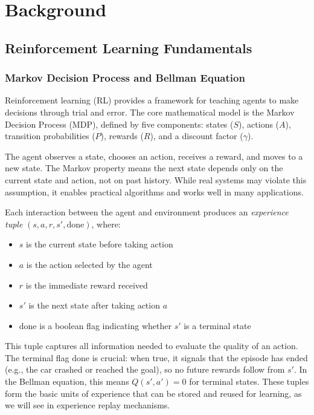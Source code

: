 \chapter{Background}
\section{Reinforcement Learning Fundamentals}

\subsection{Markov Decision Process and Bellman Equation}

Reinforcement learning (RL) provides a framework for teaching agents to make decisions through trial and error. The core mathematical model is the Markov Decision Process (MDP), defined by five components: states ($S$), actions ($A$), transition probabilities ($P$), rewards ($R$), and a discount factor ($\gamma$).

The agent observes a state, chooses an action, receives a reward, and moves to a new state. The Markov property means the next state depends only on the current state and action, not on past history. While real systems may violate this assumption, it enables practical algorithms and works well in many applications.\textbf{}

Each interaction between the agent and environment produces an \textit{experience tuple} $(s, a, r, s', \text{done})$, where:
\begin{itemize}
    \item $s$ is the current state before taking action
    \item $a$ is the action selected by the agent
    \item $r$ is the immediate reward received
    \item $s'$ is the next state after taking action $a$
    \item $\text{done}$ is a boolean flag indicating whether $s'$ is a terminal state
\end{itemize}
This tuple captures all information needed to evaluate the quality of an action. The terminal flag $\text{done}$ is crucial: when true, it signals that the episode has ended (e.g., the car crashed or reached the goal), so no future rewards follow from $s'$. In the Bellman equation, this means $Q(s', a') = 0$ for terminal states. These tuples form the basic units of experience that can be stored and reused for learning, as we will see in experience replay mechanisms.


